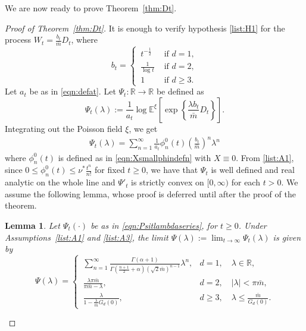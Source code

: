 \documentclass{article}[12pt]
\newtheorem{lemma}{Lemma}[section]
\theoremstyle{definition}
\newcommand{\R}{\mathbb{R}}
\newcommand{\E}{\mathbb{E}}
\newcommand{\1}{\mathbbm{1}}
\begin{document}
We are now ready to prove Theorem~\ref{thm:Dt}.
\begin{proof}[Proof of Theorem~\ref{thm:Dt}]
It is enough to verify hypothesis \ref{list:H1} for the process $W_t = \frac{b_t}{\bar{m}}D_t$, where 
\begin{equation}
    b_t = \begin{cases}
        \,t^{-\frac12} & \text{ if } d=1,\\
        \,\frac{1}{\log t} & \text{ if } d=2,\\
        \, 1 & \text{ if } d\ge 3.
    \end{cases}
    \label{eqn:btdefn}
\end{equation} 
Let $a_t$ be as in \eqref{eqn:defat}. Let $\Psi_t: \R \to \R$ be defined as  
\begin{equation}
\Psi_t(\lambda) := \frac{1}{a_t}\log\E^\xi\left[\exp\left\{\frac{\lambda b_t}{\bar{m}}D_t\right\}\right].
\label{eqn:Psitlambda}
\end{equation}
Integrating out the Poisson field $\xi$, we get 
\begin{align}
    \Psi_t(\lambda) = \sum_{n=1}^\infty \frac{1}{a_t}\phi^0_n(t)\left(\frac{b_t}{\bar{m}}\right)^n\lambda^n
    \label{eqn:Psitlambdaseries}
\end{align}
where $\phi^0_n(t)$ is defined as in \eqref{eqn:Xsmallphindefn} with $X\equiv 0$. {From \ref{list:A1}, since $0\le\phi^0_n(t)\le \nu^* \frac{t^n}{n!}$ for fixed $t\ge 0$}, we have that $\Psi_t$ is {well defined and} real analytic on the whole line and $\Psi'_t$ is strictly convex on $[0,\infty)$ for each $t>0$. We assume the following lemma, whose proof is deferred until after the proof of the theorem.
\begin{lemma}
Let $\Psi_t(\cdot)$ be as in \eqref{eqn:Psitlambdaseries}, for $t\geq 0$. Under Assumptions~{\rm\ref{list:A1}} and {\rm\ref{list:A3}}, the limit
$\Psi(\lambda):=\lim_{t\to\infty}\Psi_t(\lambda)$ is given by
\begin{equation}
\Psi(\lambda)= \begin{cases}
	\displaystyle
	\,\sum_{n=1}^{\infty}\frac{\Gamma(\alpha+1)}
{\Gamma\left(\frac{n+1}{2}+\alpha\right)
(\sqrt{2}\bar{m})^{n-1}}\lambda^n, & d=1,\quad \lambda\in\mathbb{R},\\[8pt]
	\displaystyle
	\,\frac{\lambda\pi\bar{m}}{\pi\bar{m}-\lambda}, & d=2,\quad |\lambda|<\pi\bar{m},\\[8pt]
	\displaystyle
	\,\frac{\lambda}{1-\frac{\lambda}{\bar{m}}G_d(0)},& d\geq3,\quad \lambda\leq\frac{\bar{m}}{G_d(0)}.
\end{cases}

\end{equation}
\end{lemma}
\end{proof}
\end{document}
